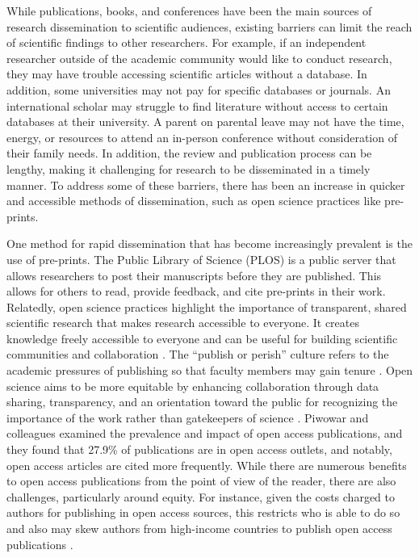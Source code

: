\documentclass[
  11pt,
]{book}
\begin{document}
While publications, books, and conferences have been the main sources of research dissemination to scientific audiences, existing barriers can limit the reach of scientific findings to other researchers. For example, if an independent researcher outside of the academic community would like to conduct research, they may have trouble accessing scientific articles without a database. In addition, some universities may not pay for specific databases or journals. An international scholar may struggle to find literature without access to certain databases at their university. A parent on parental leave may not have the time, energy, or resources to attend an in-person conference without consideration of their family needs. In addition, the review and publication process can be lengthy, making it challenging for research to be disseminated in a timely manner. To address some of these barriers, there has been an increase in quicker and accessible methods of dissemination, such as open science practices like pre-prints.

One method for rapid dissemination that has become increasingly prevalent is the use of pre-prints. The Public Library of Science (PLOS) is a public server that allows researchers to post their manuscripts before they are published. This allows for others to read, provide feedback, and cite pre-prints in their work. Relatedly, open science practices highlight the importance of transparent, shared scientific research that makes research accessible to everyone. It creates knowledge freely accessible to everyone and can be useful for building scientific communities and collaboration \citep{fecher_open_2013}. The ``publish or perish'' culture refers to the academic pressures of publishing so that faculty members may gain tenure \citep{de_rond_publish_2005}. Open science aims to be more equitable by enhancing collaboration through data sharing, transparency, and an orientation toward the public for recognizing the importance of the work rather than gatekeepers of science \citep{matsick_bridging_2021}. Piwowar and colleagues \citeyearpar{piwowar_state_2018} examined the prevalence and impact of open access publications, and they found that 27.9\% of publications are in open access outlets, and notably, open access articles are cited more frequently. While there are numerous benefits to open access publications from the point of view of the reader, there are also challenges, particularly around equity. For instance, given the costs charged to authors for publishing in open access sources, this restricts who is able to do so and also may skew authors from high-income countries to publish open access publications \citep{smith_decolonizing_2021}.
\end{document}
